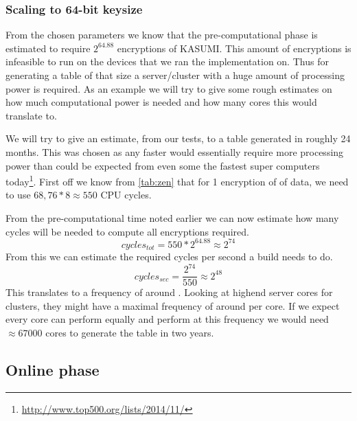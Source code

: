 \subsubsection{Scaling to 64-bit keysize}
From the chosen parameters we know that the pre-computational phase is
estimated to require $2^{64.88}$ encryptions of KASUMI. This amount of encryptions
is infeasible to run on the devices that we ran the
 implementation on. Thus for generating a table of that
size a server/cluster with a huge amount of processing power is
required. As an example we will try to give some rough estimates on
how much computational power is needed and how many cores this would
translate to.

We will try to give an estimate, from our tests, to a table generated
in roughly 24 months. This was chosen as any faster would essentially
require more processing power than could be expected from even some the
fastest super computers
today\footnote{\url{http://www.top500.org/lists/2014/11/}}. First off
we know from \ref{tab:zen} that for 1 encryption of
 of data, we need to use $68,76 * 8 \approx 550$ CPU
cycles.

From the pre-computational time noted earlier we can now estimate how
many cycles will be needed to compute all encryptions required.
\[ cycles_{tot} = 550 * 2^{64.88} \approx 2^{74}\]
From this we can estimate the required cycles per second a build needs
to do.
\[ cycles_{sec} = \frac{2^{74}}{550} \approx 2^{48}\]
This translates to a frequency of around  . Looking at
highend server cores for clusters, they might have a maximal frequency
of around per core. If we expect every core can perform
equally and perform at this frequency we would need $\approx 67000$
cores to generate the table in two years.


\subsection{Online phase}
